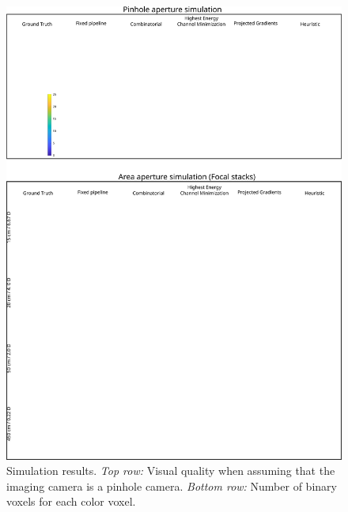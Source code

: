 \begin{figure}[h!]
\centering
\includegraphics[width=0.99\columnwidth]{images/volumetric/acd_exp1/exp_combined}
\caption[Adaptive color decomposition: focal stack]{Simulation results. \emph{Top row:} Visual quality when assuming that the imaging camera is a pinhole camera. \emph{Bottom row:} Number of binary voxels for each color voxel.}
\label{fig:volumetric:acd:exp1:focalstack}
\end{figure}

